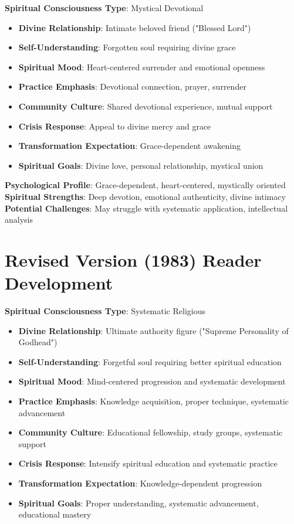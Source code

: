 \documentclass[11pt,twoside]{book}
\begin{document}
\textbf{\textbf{Spiritual Consciousness Type}}: Mystical Devotional
\begin{itemize}
\item \textbf{\textbf{Divine Relationship}}: Intimate beloved friend ("Blessed Lord")
\item \textbf{\textbf{Self-Understanding}}: Forgotten soul requiring divine grace
\item \textbf{\textbf{Spiritual Mood}}: Heart-centered surrender and emotional openness
\item \textbf{\textbf{Practice Emphasis}}: Devotional connection, prayer, surrender
\item \textbf{\textbf{Community Culture}}: Shared devotional experience, mutual support
\item \textbf{\textbf{Crisis Response}}: Appeal to divine mercy and grace
\item \textbf{\textbf{Transformation Expectation}}: Grace-dependent awakening
\item \textbf{\textbf{Spiritual Goals}}: Divine love, personal relationship, mystical union
\end{itemize}

\textbf{\textbf{Psychological Profile}}: Grace-dependent, heart-centered, mystically oriented
\textbf{\textbf{Spiritual Strengths}}: Deep devotion, emotional authenticity, divine intimacy
\textbf{\textbf{Potential Challenges}}: May struggle with systematic application, intellectual analysis
\section*{Revised Version (1983) Reader Development}
\label{sec:org32baf56}

\textbf{\textbf{Spiritual Consciousness Type}}: Systematic Religious  
\begin{itemize}
\item \textbf{\textbf{Divine Relationship}}: Ultimate authority figure ("Supreme Personality of Godhead")
\item \textbf{\textbf{Self-Understanding}}: Forgetful soul requiring better spiritual education
\item \textbf{\textbf{Spiritual Mood}}: Mind-centered progression and systematic development
\item \textbf{\textbf{Practice Emphasis}}: Knowledge acquisition, proper technique, systematic advancement
\item \textbf{\textbf{Community Culture}}: Educational fellowship, study groups, systematic support
\item \textbf{\textbf{Crisis Response}}: Intensify spiritual education and systematic practice
\item \textbf{\textbf{Transformation Expectation}}: Knowledge-dependent progression
\item \textbf{\textbf{Spiritual Goals}}: Proper understanding, systematic advancement, educational mastery
\end{itemize}
\end{document}
